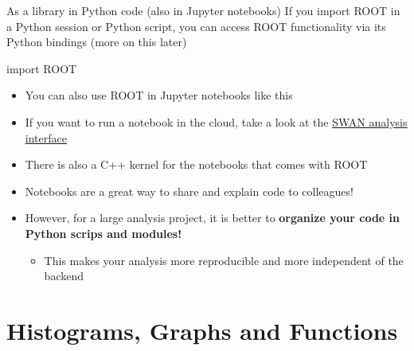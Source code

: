 \documentclass[aspectratio=169]{beamer}
\newcommand{\myhref}[2]{{\color{blue}\href{#1}{\underline{#2}}}}
\begin{document}
\begin{frame}[fragile]{As a library in Python code (also in Jupyter notebooks)}
If you import ROOT in a Python session or Python script, you can access ROOT functionality via its Python bindings (more on this later)
    \begin{pycell}
import ROOT
    \end{pycell}
\begin{itemize}
    \item You can also use ROOT in Jupyter notebooks like this
    \item If you want to run a notebook in the cloud, take a look at the \myhref{https://swan.cern.ch}{SWAN analysis interface}
    \item There is also a C++ kernel for the notebooks that comes with ROOT
    \item Notebooks are a great way to share and explain code to colleagues!
    \item However, for a large analysis project, it is better to \textbf{organize your code in Python scrips and modules!}
    \begin{itemize}
        \item This makes your analysis more reproducible and more independent of the backend
    \end{itemize}
\end{itemize}
\end{frame}

\section{Histograms, Graphs and Functions}
\end{document}
